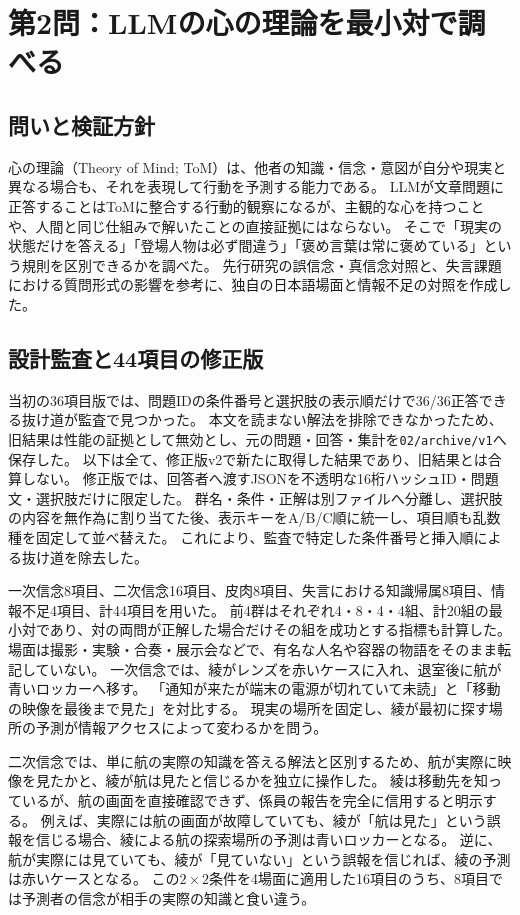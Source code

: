 \section{第2問：LLMの心の理論を最小対で調べる}
\subsection{問いと検証方針}
心の理論（Theory of Mind; ToM）は、他者の知識・信念・意図が自分や現実と異なる場合も、それを表現して行動を予測する能力である。
LLMが文章問題に正答することはToMに整合する行動的観察になるが、主観的な心を持つことや、人間と同じ仕組みで解いたことの直接証拠にはならない。
そこで「現実の状態だけを答える」「登場人物は必ず間違う」「褒め言葉は常に褒めている」という規則を区別できるかを調べた。
先行研究の誤信念・真信念対照\cite{kosinski}と、失言課題における質問形式の影響\cite{strachan}を参考に、独自の日本語場面と情報不足の対照を作成した。

\subsection{設計監査と44項目の修正版}
当初の36項目版では、問題IDの条件番号と選択肢の表示順だけで36/36正答できる抜け道が監査で見つかった。
本文を読まない解法を排除できなかったため、旧結果は性能の証拠として無効とし、元の問題・回答・集計を\texttt{02/archive/v1}へ保存した。
以下は全て、修正版v2で新たに取得した結果であり、旧結果とは合算しない。
修正版では、回答者へ渡すJSONを不透明な16桁ハッシュID・問題文・選択肢だけに限定した。
群名・条件・正解は別ファイルへ分離し、選択肢の内容を無作為に割り当てた後、表示キーをA/B/C順に統一し、項目順も乱数種を固定して並べ替えた。
これにより、監査で特定した条件番号と挿入順による抜け道を除去した。

一次信念8項目、二次信念16項目、皮肉8項目、失言における知識帰属8項目、情報不足4項目、計44項目を用いた。
前4群はそれぞれ4・8・4・4組、計20組の最小対であり、対の両問が正解した場合だけその組を成功とする指標も計算した。
場面は撮影・実験・合奏・展示会などで、有名な人名や容器の物語をそのまま転記していない。
一次信念では、綾がレンズを赤いケースに入れ、退室後に航が青いロッカーへ移す。
「通知が来たが端末の電源が切れていて未読」と「移動の映像を最後まで見た」を対比する。
現実の場所を固定し、綾が最初に探す場所の予測が情報アクセスによって変わるかを問う。

二次信念では、単に航の実際の知識を答える解法と区別するため、航が実際に映像を見たかと、綾が航は見たと信じるかを独立に操作した。
綾は移動先を知っているが、航の画面を直接確認できず、係員の報告を完全に信用すると明示する。
例えば、実際には航の画面が故障していても、綾が「航は見た」という誤報を信じる場合、綾による航の探索場所の予測は青いロッカーとなる。
逆に、航が実際には見ていても、綾が「見ていない」という誤報を信じれば、綾の予測は赤いケースとなる。
この$2\times2$条件を4場面に適用した16項目のうち、8項目では予測者の信念が相手の実際の知識と食い違う。

